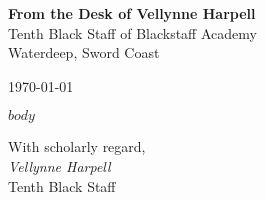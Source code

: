 \documentclass[12pt]{article}
\begin{document}
\begin{center}
\Large\textbf{From the Desk of Vellynne Harpell}\\
\normalsize Tenth Black Staff of Blackstaff Academy\\
\small Waterdeep, Sword Coast
\end{center}

\vspace{1em}
\begin{flushright}
\today
\end{flushright}

\vspace{1em}

$body$

\vspace{2em}
\begin{flushright}
With scholarly regard,\\
\vspace{1em}
\textit{Vellynne Harpell}\\
Tenth Black Staff
\end{flushright}
\end{document}
